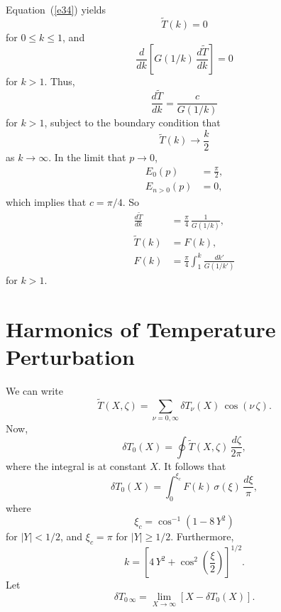 \documentclass[12pt,prb,aps,notitlepage]{revtex4-1}
\begin{document}
Equation~(\ref{e34}) yields
\begin{equation}
\tilde{T}(k) = 0
\end{equation}
for $0\leq k\leq 1$, and 
\begin{equation}
\frac{d}{dk}\!\left[G(1/k)\,\frac{d\tilde{T}}{dk}\right]=0
\end{equation}
for $k>1$. Thus,
\begin{equation}
\frac{d\tilde{T}}{dk} = \frac{c}{G(1/k)}
\end{equation}
for $k>1$, subject to the boundary condition that
\begin{equation}
\tilde{T}(k)\rightarrow \frac{k}{2}
\end{equation}
as $k\rightarrow \infty$. In the limit that $p\rightarrow 0$, 
\begin{align}
E_0(p)&=\frac{\pi}{2},\\[0.5ex]
E_{n>0}(p) &= 0,
\end{align}
which implies that $c=\pi/4$. So
\begin{align}
\frac{d\tilde{T}}{dk} &= \frac{\pi}{4}\,\frac{1}{G(1/k)},\\[0.5ex]
\tilde{T}(k) &= F(k),\\[0.5ex]
F(k) &= \frac{\pi}{4}\int_1^k\frac{dk'}{G(1/k')}
\end{align}
for $k>1$. 

\section{Harmonics of Temperature Perturbation}
We can write
\begin{equation}
\tilde{T}(X,\zeta)=\sum_{\nu=0,\infty}\delta T_\nu(X)\,\cos(\nu\,\zeta).
\end{equation}
Now,
\begin{equation}
\delta T_0(X) = \oint \tilde{T}(X,\zeta)\,\frac{d\zeta}{2\pi},
\end{equation}
where the integral is at constant $X$. It follows that
\begin{equation}
\delta T_0(X) = \int_0^{\xi_c}F(k)\,\sigma(\xi)\,\frac{d\xi}{\pi},
\end{equation}
where 
\begin{equation}
\xi_c = \cos^{-1}(1-8\,Y^2)
\end{equation}
for $|Y|<1/2$, and $\xi_c=\pi$ for $|Y|\geq 1/2$. Furthermore,
\begin{equation}
k =\left[4\,Y^2 +\cos^2\left(\frac{\xi}{2}\right)\right]^{1/2}.
\end{equation}
Let 
\begin{equation}
\delta T_{0\,\infty} =\lim_{X\rightarrow \infty}\left[X - \delta T_0(X)\right].
\end{equation}
\end{document}
